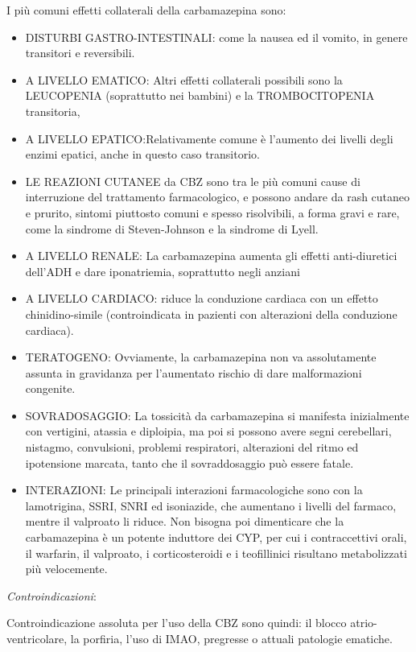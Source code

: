 \begin{itemize}
I più comuni effetti collaterali della carbamazepina sono:

\begin{itemize}
\item
  DISTURBI GASTRO-INTESTINALI: come la nausea ed il vomito, in genere
  transitori e reversibili.
\item
  A LIVELLO EMATICO: Altri effetti collaterali possibili sono la
  LEUCOPENIA (soprattutto nei bambini) e la TROMBOCITOPENIA transitoria,
\item
  A LIVELLO EPATICO:Relativamente comune è l'aumento dei livelli degli
  enzimi epatici, anche in questo caso transitorio.
\item
  LE REAZIONI CUTANEE da CBZ sono tra le più comuni cause di
  interruzione del trattamento farmacologico, e possono andare da rash
  cutaneo e prurito, sintomi piuttosto comuni e spesso risolvibili, a
  forma gravi e rare, come la sindrome di Steven-Johnson e la sindrome
  di Lyell.
\item
  A LIVELLO RENALE: La carbamazepina aumenta gli effetti anti-diuretici
  dell'ADH e dare iponatriemia, soprattutto negli anziani
\item
  A LIVELLO CARDIACO: riduce la conduzione cardiaca con un effetto
  chinidino-simile (controindicata in pazienti con alterazioni della
  conduzione cardiaca).
\item
  TERATOGENO: Ovviamente, la carbamazepina non va assolutamente assunta
  in gravidanza per l'aumentato rischio di dare malformazioni congenite.
\item
  SOVRADOSAGGIO: La tossicità da carbamazepina si manifesta inizialmente
  con vertigini, atassia e diploipia, ma poi si possono avere segni
  cerebellari, nistagmo, convulsioni, problemi respiratori, alterazioni
  del ritmo ed ipotensione marcata, tanto che il sovraddosaggio può
  essere fatale.
\item
  INTERAZIONI: Le principali interazioni farmacologiche sono con la
  lamotrigina, SSRI, SNRI ed isoniazide, che aumentano i livelli del
  farmaco, mentre il valproato li riduce. Non bisogna poi dimenticare
  che la carbamazepina è un potente induttore dei CYP, per cui i
  contraccettivi orali, il warfarin, il valproato, i corticosteroidi e i
  teofillinici risultano metabolizzati più velocemente.
\end{itemize}

\emph{\emph{Controindicazioni}}:

Controindicazione assoluta per l'uso della CBZ sono quindi: il blocco
atrio-ventricolare, la porfiria, l'uso di IMAO, pregresse o attuali
patologie ematiche.


\end{itemize}
